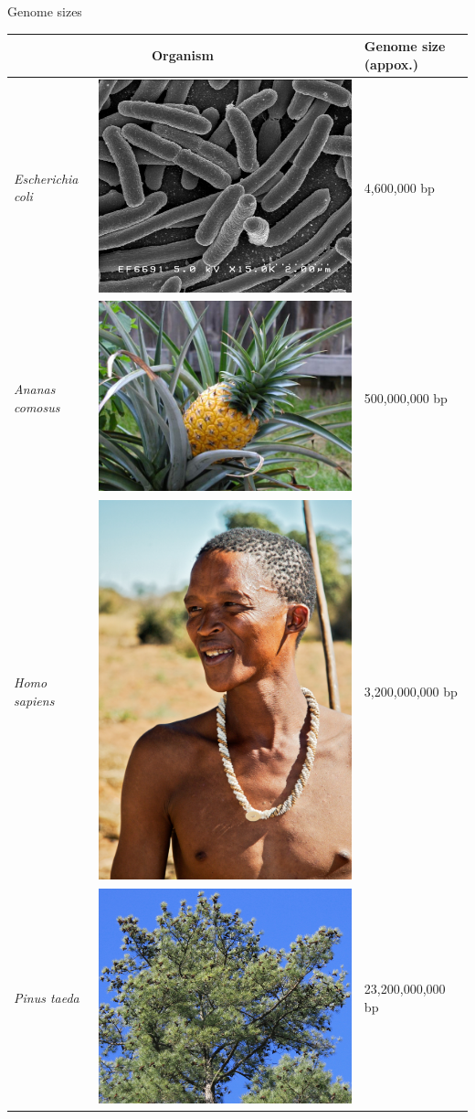 \documentclass[xcolor=dvipsnames]{beamer}
\begin{document}
\begin{frame}{Genome sizes}
    \begin{tabular}{|m{2.8cm}m{2.6cm}|m{3.8cm}|}
        \hline
        \multicolumn{2}{|c|}{ {\bf Organism }} & {\bf Genome size (appox.)} \\
        \hline
        { \it Escherichia coli}
        &
        \includegraphics[height=0.15\textwidth]{E_coli.jpg}
        & 4,600,000 bp \\
        \hline
        {\it Ananas comosus} &
        \includegraphics[height=0.15\textwidth]{Pineapple.jpg}
        & 500,000,000 bp \\
        \hline
        {\it Homo sapiens} &
        \includegraphics[height=0.15\textwidth,clip=true,trim=0 180 0 0]{Human.jpg}
        & 3,200,000,000 bp \\
        \hline
        {\it Pinus taeda} &
        \includegraphics[height=0.15\textwidth]{LoblollyPine.jpg}
        & 23,200,000,000 bp \\
        \hline
    \end{tabular}
\end{frame}
\end{document}
